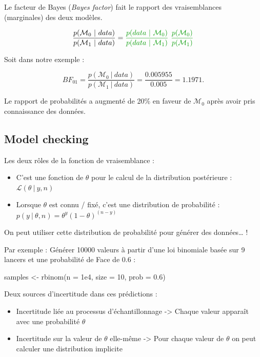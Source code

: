 \documentclass[
  a4paper,11pt,twoside,onecolumn,openright,final,oldfontcommands]{memoir}
\newenvironment{Shaded}{\begin{snugshade}}{\end{snugshade}}
\newcommand{\AttributeTok}[1]{\textcolor[rgb]{0.77,0.63,0.00}{#1}}
\newcommand{\DecValTok}[1]{\textcolor[rgb]{0.00,0.00,0.81}{#1}}
\newcommand{\FloatTok}[1]{\textcolor[rgb]{0.00,0.00,0.81}{#1}}
\newcommand{\FunctionTok}[1]{\textcolor[rgb]{0.00,0.00,0.00}{#1}}
\newcommand{\NormalTok}[1]{#1}
\newcommand{\OtherTok}[1]{\textcolor[rgb]{0.56,0.35,0.01}{#1}}
\providecommand{\tightlist}{%
  \setlength{\itemsep}{0pt}\setlength{\parskip}{0pt}}
\theoremstyle{definition}
\theoremstyle{definition}
\theoremstyle{definition}
\theoremstyle{remark}
\begin{document}
Le facteur de Bayes (\emph{Bayes factor}) fait le rapport des vraisemblances (marginales) des deux modèles.

\[
\frac{p(\mathcal{M}_{0} \ | \ data)}{p(\mathcal{M}_{1} \ | \ data)} = \color{green}{\frac{p(data \ | \ \mathcal{M}_{0})}{p(data \ | \ \mathcal{M}_{1})}} \ \frac{p(\mathcal{M}_{0})}{p(\mathcal{M}_{1})}
\]

Soit dans notre exemple :

\[
BF_{01} = \frac{p(\mathcal{M}_{0} \ | \ data)}{p(\mathcal{M}_{1} \ | \ data)} = \frac{0.005955}{0.005} = 1.1971.
\]

Le rapport de probabilités a augmenté de 20\% en faveur de \(\mathcal{M}_{0}\) après avoir pris connaissance des données.

\hypertarget{model-checking}{%
\subsection{Model checking}\label{model-checking}}

Les deux rôles de la fonction de vraisemblance :

\begin{itemize}
\tightlist
\item
  C'est une fonction de \(\theta\) pour le calcul de la distribution postérieure : \(\mathcal{L}(\theta \ | \ y, n)\)
\item
  Lorsque \(\theta\) est connu / fixé, c'est une distribution de probabilité : \(p(y \ |\ \theta, n) = \theta^y(1 - \theta)^{(n - y)}\)
\end{itemize}

On peut utiliser cette distribution de probabilité pour générer des données\ldots{} !

Par exemple : Générer 10000 valeurs à partir d'une loi binomiale basée sur 9 lancers et une probabilité de Face de 0.6 :

\begin{Shaded}
\begin{Highlighting}[]
\NormalTok{samples }\OtherTok{\textless{}{-}} \FunctionTok{rbinom}\NormalTok{(}\AttributeTok{n =} \FloatTok{1e4}\NormalTok{, }\AttributeTok{size =} \DecValTok{10}\NormalTok{, }\AttributeTok{prob =} \FloatTok{0.6}\NormalTok{)}
\end{Highlighting}
\end{Shaded}

Deux sources d'incertitude dans ces prédictions :

\begin{itemize}
\tightlist
\item
  Incertitude liée au processus d'échantillonnage
  -\textgreater{} Chaque valeur apparaît avec une probabilité \(\theta\)
\item
  Incertitude sur la valeur de \(\theta\) elle-même
  -\textgreater{} Pour chaque valeur de \(\theta\) on peut calculer une distribution implicite
\end{itemize}
\end{document}
